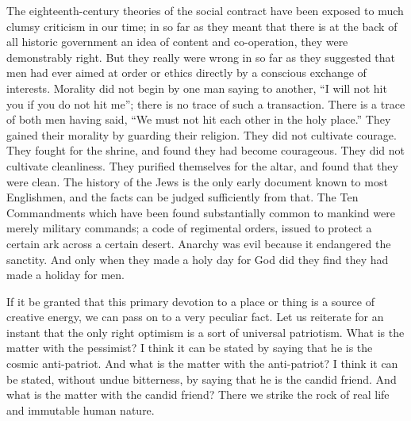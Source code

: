 \documentclass{book}
\begin{document}
The eighteenth-century theories of the social contract have been exposed to much clumsy criticism in our time; in so far as they meant that there is at the back of all historic government an idea of content and co-operation, they were demonstrably right. But they really were wrong in so far as they suggested that men had ever aimed at order or ethics directly by a conscious exchange of interests. Morality did not begin by one man saying to another, “I will not hit you if you do not hit me”; there is no trace of such a transaction. There is a trace of both men having said, “We must not hit each other in the holy place.” They gained their morality by guarding their religion. They did not cultivate courage. They fought for the shrine, and found they had become courageous. They did not cultivate cleanliness. They purified themselves for the altar, and found that they were clean. The history of the Jews is the only early document known to most Englishmen, and the facts can be judged sufficiently from that. The Ten Commandments which have been found substantially common to mankind were merely military commands; a code of regimental orders, issued to protect a certain ark across a certain desert. Anarchy was evil because it endangered the sanctity. And only when they made a holy day for God did they find they had made a holiday for men.

If it be granted that this primary devotion to a place or thing is a source of creative energy, we can pass on to a very peculiar fact. Let us reiterate for an instant that the only right optimism is a sort of universal patriotism. What is the matter with the pessimist? I think it can be stated by saying that he is the cosmic anti-patriot. And what is the matter with the anti-patriot? I think it can be stated, without undue bitterness, by saying that he is the candid friend. And what is the matter with the candid friend? There we strike the rock of real life and immutable human nature.
\end{document}
